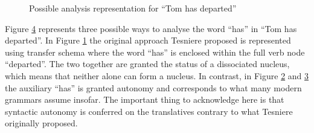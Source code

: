     \begin{figure}[!ht]
        \centering
        \begin{subfigure}{.33\textwidth}
            \centering
            \caption{}
            \label{fig:stemma8-sub1}
        \end{subfigure}%
        \begin{subfigure}{.33\textwidth}
            \centering
            \caption{}
            \label{fig:stemma8-sub2}
        \end{subfigure}
        \begin{subfigure}{.33\textwidth}
            \centering
            \caption{}
            \label{fig:stemma8-sub3}
        \end{subfigure}
        \caption{Possible analysis representation for ``Tom has departed''}
        \label{fig:stemma8}
    \end{figure}

    Figure \ref{fig:stemma8} represents three possible ways to analyse the word ``has'' in ``Tom has departed''. In Figure \ref{fig:stemma8-sub1} the original approach Tesniere proposed is represented using transfer schema where the word ``has'' is enclosed within the full verb node ``departed''. The two together are granted the status of a dissociated nucleus, which means that neither alone can form a nucleus. In contrast, in Figure \ref{fig:stemma8-sub2} and \ref{fig:stemma8-sub3} the auxiliary ``has'' is granted autonomy and corresponds to what many modern grammars assume insofar. The important thing to acknowledge here is that syntactic autonomy is conferred on the translatives contrary to what Tesniere originally proposed. 

